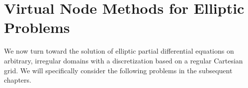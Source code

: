 %

\part{Virtual Node Methods for Elliptic Problems} \label{pt:elliptic}

We now turn toward the solution of elliptic partial differential equations on arbitrary, irregular domains with a discretization based on a regular Cartesian grid. We will specifically consider the following problems in the subsequent chapters.

\begin{itemize}


\end{itemize}
